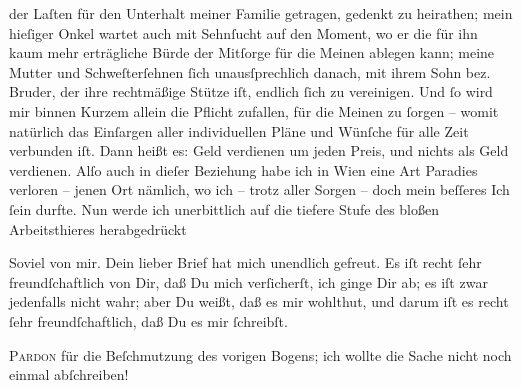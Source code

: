                der Laſten für den Unterhalt meiner Familie getragen, gedenkt zu heirathen; mein
               hieſiger Onkel
               wartet auch mit Sehnſucht auf den Moment, wo er die für ihn kaum mehr erträgliche
               Bürde der Mitſorge für die Meinen ablegen kann; meine Mutter und Schweſterſehnen{ }ſich unausſprechlich
               danach, mit ihrem Sohn bez. Bruder, der ihre rechtmäßige Stütze iſt, endlich{ }ſich {\pb}zu vereinigen. Und{ }ſo wird mir binnen Kurzem allein
               die Pflicht zufallen, für die Meinen zu{ }ſorgen – womit natürlich das Einſargen aller
               individuellen Pläne und Wünſche für alle Zeit verbunden iſt. Dann heißt es: Geld
               verdienen um jeden Preis, und nichts als Geld verdienen. Alſo auch in dieſer
               Beziehung habe ich in Wien eine Art Paradies
               verloren – jenen Ort nämlich, wo
               ich – trotz aller Sorgen – doch mein beſſeres Ich{ }ſein durfte. Nun werde ich
               unerbittlich auf die tiefere Stufe des bloßen Arbeitsthieres herabgedrückt{\dotsfive}\pend
           
\pstart
           Soviel von mir. Dein lieber Brief hat mich unendlich gefreut. Es iſt recht{ }ſehr
               freundſchaftlich von Dir, daß Du mich verſicherſt, ich ginge Dir ab; es iſt zwar
               jedenfalls nicht wahr; aber Du weißt, daß es mir wohlthut, und darum iſt es recht{ }ſehr freundſchaftlich, daß Du es mir{ }ſchreibſt.\pend
           
\pstart
           {\pb}\textsc{Pardon} für die Beſchmutzung des vorigen Bogens; ich wollte
               die Sache nicht noch einmal abſchreiben!\pend
           
